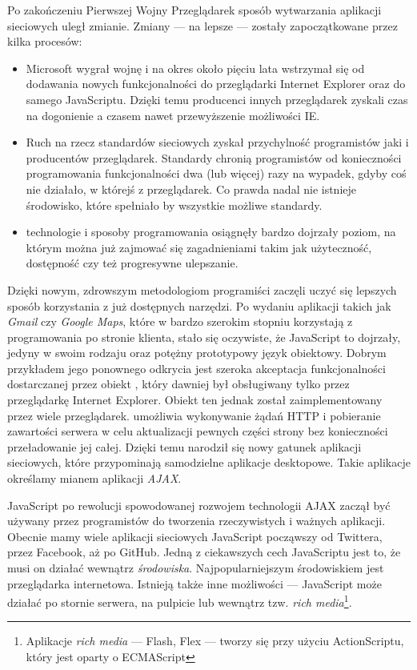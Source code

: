 Po zakończeniu Pierwszej Wojny Przeglądarek sposób wytwarzania aplikacji sieciowych uległ zmianie. Zmiany --- na lepsze --- zostały zapoczątkowane przez kilka procesów\cite{stefanov10}: 
\begin{itemize}
 \item Microsoft wygrał wojnę i na okres około pięciu lata wstrzymał się od dodawania nowych funkcjonalności do przeglądarki Internet Explorer oraz do samego JavaScriptu. Dzięki temu producenci innych przeglądarek zyskali czas na dogonienie a czasem nawet przewyższenie możliwości IE.
 \item Ruch na rzecz standardów sieciowych zyskał przychylność programistów jaki i producentów przeglądarek. Standardy chronią programistów od konieczności programowania funkcjonalności dwa (lub więcej) razy na wypadek, gdyby coś nie działało, w którejś z przeglądarek. Co prawda nadal nie istnieje środowisko, które spełniało by wszystkie możliwe standardy.
 \item technologie i sposoby programowania osiągnęły bardzo dojrzały poziom, na którym można już zajmować się zagadnieniami takim jak użyteczność, dostępność czy też progresywne ulepszanie. 
\end{itemize}
Dzięki nowym, zdrowszym metodologiom programiści zaczęli uczyć się lepszych sposób korzystania z już dostępnych narzędzi. Po wydaniu aplikacji takich jak \emph{Gmail} czy \emph{Google Maps}, które w bardzo szerokim stopniu korzystają z programowania po stronie klienta, stało się oczywiste, że JavaScript to dojrzały, jedyny w swoim rodzaju oraz potężny prototypowy język obiektowy\cite{stefanov10}. Dobrym przykładem jego ponownego odkrycia jest szeroka akceptacja funkcjonalności dostarczanej przez obiekt , który dawniej był obsługiwany tylko przez przeglądarkę Internet Explorer. Obiekt ten jednak został zaimplementowany przez wiele przeglądarek.  umożliwia wykonywanie żądań HTTP i pobieranie zawartości serwera w celu aktualizacji pewnych części strony bez konieczności przeładowanie jej całej. Dzięki temu narodził się nowy gatunek aplikacji sieciowych, które przypominają samodzielne aplikacje desktopowe. Takie aplikacje określamy mianem aplikacji \emph{AJAX}.

JavaScript po rewolucji spowodowanej rozwojem technologii AJAX zaczął być używany przez programistów do tworzenia rzeczywistych i ważnych aplikacji. Obecnie mamy wiele aplikacji sieciowych JavaScript począwszy od Twittera, przez Facebook, aż po GitHub\cite{cantelon14}. Jedną z ciekawszych cech JavaScriptu jest to, że musi on działać wewnątrz \emph{środowiska}. Najpopularniejszym środowiskiem jest przeglądarka internetowa. Istnieją także inne możliwości --- JavaScript może działać po stornie serwera, na pulpicie lub wewnątrz tzw. \emph{rich media}\footnote{Aplikacje \textit{rich media} --- Flash, Flex --- tworzy się przy użyciu ActionScriptu, który jest oparty o ECMAScript}. 


